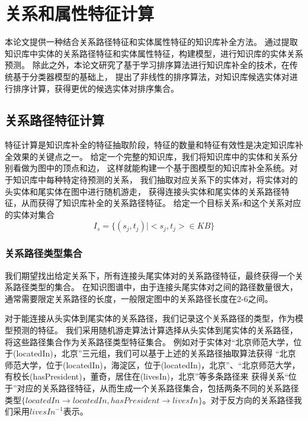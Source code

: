 
\chapter{关系和属性特征计算}
\label{cha:kbc-lit-relation}
本论文提供一种结合关系路径特征和实体属性特征的知识库补全方法。
通过提取知识库中实体的关系路径特征和实体属性特征，构建模型，进行知识库的实体关系预测。
除此之外，本论文研究了基于学习排序算法进行知识库补全的技术，在传统基于分类器模型的基础上，
提出了非线性的排序算法，对知识库候选实体对进行排序计算，获得更优的候选实体对排序集合。

\section{关系路径特征计算}
\label{sec:relational-compute}
特征计算是知识库补全的特征抽取阶段，特征的数量和特征有效性是决定知识库补全效果的关键点之一。
给定一个完整的知识库，我们将知识库中的实体和关系分别看做为图中的顶点和边，
这样就能构建一个基于图模型的知识库补全系统。对于知识库中每种特定待预测的关系，
我们抽取对应关系下的实体对，将实体对的头实体和尾实体在图中进行随机游走\cite{Lao2012}，
获得连接头实体和尾实体的关系路径特征，从而获得了知识库补全的关系路径特征。
给定一个目标关系r和这个关系对应的实体对集合
$$I_s=\{(s_j,t_j)|<s_j,t_j> \in KB\}$$


\subsection{关系路径类型集合}
\label{sec:relational-set}
我们期望找出给定关系下，所有连接头尾实体对的关系路径特征，最终获得一个关系路径类型的集合。
在知识图谱中，由于连接头尾实体对之间的路径数量很大，通常需要限定关系路径的长度，一般限定图中的关系路径长度在2-6之间。

对于能连接从头实体到尾实体的关系路径，我们记录这个关系路径的类型，作为模型预测的特征。
我们采用随机游走算法\cite{Lovsz1993RandomWO}计算选择从头实体到尾实体的关系路径，将这些路径集合作为关系路径类型特征集合。
例如对于实体对“北京师范大学，位于(locatedIn)，北京”三元组，我们可以基于上述的关系路径抽取算法获得
“北京师范大学，位于(locatedIn)，海淀区，位于(locatedIn)，北京”、“北京师范大学，有校长(hasPresident)，董奇，居住在(livesIn)，北京”等多条路径来
获得关系“位于”对应的关系路径特征，从而生成一个关系路径集合，包括两条不同的关系路径类型$\{locatedIn\to locatedIn, hasPresident \to livesIn\}$。对于反方向的关系路径我们采用${livesIn}^{-1}$表示。

